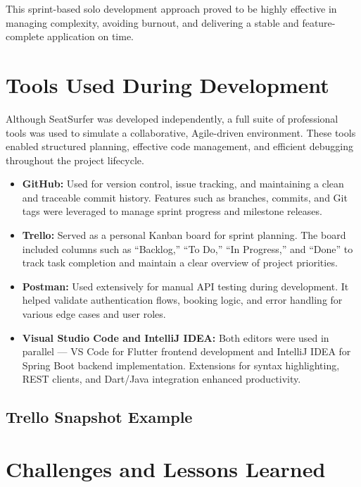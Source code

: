 \documentclass[12pt,a4paper]{report} %
\begin{document}
This sprint-based solo development approach proved to be highly effective in managing complexity, avoiding burnout, and delivering a stable and feature-complete application on time.

\section{Tools Used During Development}

Although SeatSurfer was developed independently, a full suite of professional tools was used to simulate a collaborative, Agile-driven environment. These tools enabled structured planning, effective code management, and efficient debugging throughout the project lifecycle.

\begin{itemize}
\item \textbf{GitHub:}
Used for version control, issue tracking, and maintaining a clean and traceable commit history. Features such as branches, commits, and Git tags were leveraged to manage sprint progress and milestone releases.
\item \textbf{Trello:}  
Served as a personal Kanban board for sprint planning. The board included columns such as “Backlog,” “To Do,” “In Progress,” and “Done” to track task completion and maintain a clear overview of project priorities.
\item \textbf{Postman:}  
Used extensively for manual API testing during development. It helped validate authentication flows, booking logic, and error handling for various edge cases and user roles.
\item \textbf{Visual Studio Code and IntelliJ IDEA:}  
Both editors were used in parallel — VS Code for Flutter frontend development and IntelliJ IDEA for Spring Boot backend implementation. Extensions for syntax highlighting, REST clients, and Dart/Java integration enhanced productivity.
\end{itemize}

\subsection*{Trello Snapshot Example}


\section{Challenges and Lessons Learned}
\end{document}
